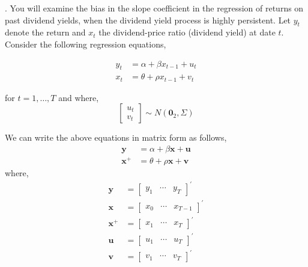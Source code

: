 \citep{stambaugh1999predictive}. You will examine the bias in the slope coefficient in the regression of returns on past dividend yields, when the dividend yield process is highly persistent. Let \(y_t\) denote the return and \(x_t\) the dividend-price ratio (dividend yield) at date \(t\). Consider the following regression equations,

\begin{align*}
    y_t &= \alpha + \beta x_{t-1} + u_t \\
    x_t &= \theta + \rho x_{t-1} + v_t
\end{align*}

for \(t = 1, \dots, T\) and where,
\[
    \begin{bmatrix} u_t \\ v_t \end{bmatrix} \sim N(\mathbf 0_2, \Sigma)
\]

We can write the above equations in matrix form as follows,
\begin{align*}
    \mathbf{y} & = \alpha + \beta\mathbf{x} + \mathbf{u} \\ 
    \mathbf{x}^{+} & = \theta + \rho\mathbf{x} + \mathbf{v}
\end{align*}
where,
\begin{align*}
    \mathbf y & = \begin{bmatrix} y_1 & \cdots & y_T \end{bmatrix}^\prime \\
    \mathbf x & = \begin{bmatrix} x_0 & \cdots & x_{T-1} \end{bmatrix}^\prime \\
    \mathbf x^{+}  & = \begin{bmatrix} x_1 & \cdots & x_T \end{bmatrix}^\prime \\
    \mathbf u & = \begin{bmatrix} u_1 & \cdots & u_T \end{bmatrix}^\prime \\
    \mathbf v & = \begin{bmatrix} v_1 & \cdots & v_T \end{bmatrix}^\prime \\
\end{align*}

